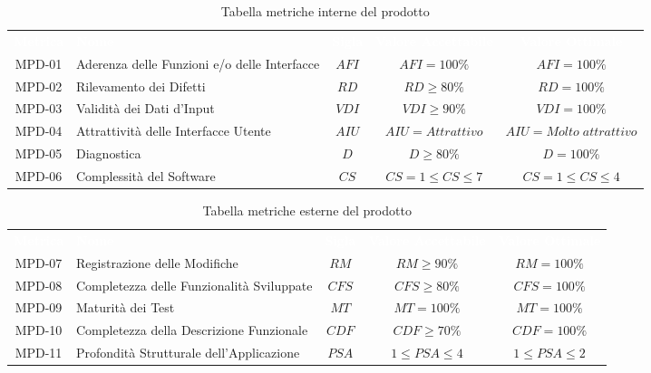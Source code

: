     \renewcommand{\arraystretch}{1.5}
    \begin{longtable}{ c C{4cm} c c c}
    \caption{Tabella metriche interne del prodotto}\\
    \textcolor{white}{\textbf{Metrica}} & \textcolor{white}{\textbf{Nome}} & \textcolor{white}{\textbf{Sigla}} & \textcolor{white}{\textbf{Valore Accettabile}} & \textcolor{white}{\textbf{Valore Ottimale}}\\
    MPD-01 & Aderenza delle Funzioni e/o delle Interfacce & $AFI$ & $AFI = 100\%$ & $AFI = 100\%$ \\
    MPD-02 & Rilevamento dei Difetti & $RD$ & $ RD \geq 80\% $ & $RD = 100\%$ \\
    MPD-03 & Validità dei Dati d'Input & $VDI$ &  $VDI \geq 90\%$ &  $VDI = 100\%$ \\
    MPD-04 & Attrattività delle Interfacce Utente & $AIU$ & $AIU = Attrattivo$ &  $AIU = Molto \; attrattivo$ \\
    MPD-05 & Diagnostica & $D$ & $D \geq 80\% $ & $D = 100\% $ \\
    MPD-06 & Complessità del Software & $CS $ & $CS = 1 \leq CS \leq 7 $ & $CS = 1 \leq CS \leq 4$ \\
    \end{longtable} 

\newpage %

    \renewcommand{\arraystretch}{1.5}
    \begin{longtable}{ c C{4cm} c c c}
    \caption{Tabella metriche esterne del prodotto}\\
    \textcolor{white}{\textbf{Metrica}} & \textcolor{white}{\textbf{Nome}} & \textcolor{white}{\textbf{Sigla}} & \textcolor{white}{\textbf{Valore Accettabile}} & \textcolor{white}{\textbf{Valore Ottimale}}\\
    MPD-07 & Registrazione delle Modifiche & $RM$ & $RM \geq 90\%$ & $RM = 100\%$ \\
    MPD-08 & Completezza delle Funzionalità Sviluppate & $CFS$ & $CFS \geq 80\%$ & $CFS = 100\%$  \\
    MPD-09 & Maturità dei Test & $MT$ & $MT=100\% $ & $MT=100\%$  \\	
    MPD-10 & Completezza della Descrizione Funzionale & $CDF $ & $CDF \geq 70\%$ & $CDF = 100\%$  \\
    MPD-11 &  Profondità Strutturale dell'Applicazione & $PSA$ & $1 \leq PSA \leq 4$ &$1 \leq PSA \leq 2$  \\
    \end{longtable}
